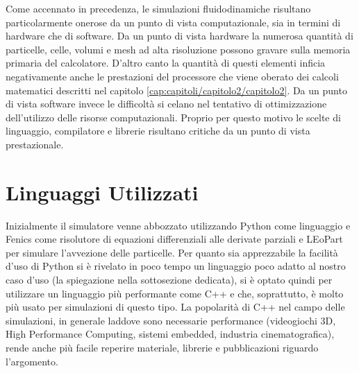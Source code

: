 Come accennato in precedenza, le simulazioni fluidodinamiche risultano
particolarmente onerose da un punto di vista computazionale, sia in termini di
hardware che di software. Da un punto di vista hardware la numerosa quantità di
particelle, celle, volumi e mesh ad alta risoluzione possono gravare sulla memoria primaria del
calcolatore. D'altro canto la quantità di questi elementi inficia negativamente
anche le prestazioni del processore che viene oberato dei calcoli matematici
descritti nel capitolo \ref{cap:capitoli/capitolo2/capitolo2}. \newline
Da un punto di vista software invece le difficoltà si celano nel tentativo di
ottimizzazione dell'utilizzo delle risorse computazionali. Proprio per questo motivo
le scelte di linguaggio, compilatore e librerie risultano critiche da un punto di vista
prestazionale.


\section{Linguaggi Utilizzati}
Inizialmente il simulatore venne abbozzato utilizzando Python come linguaggio e
Fenics \cite{AlnaesBlechta2015a} come risolutore di equazioni differenziali alle derivate
parziali e LEoPart \cite{maljaars2020} per simulare l'avvezione delle particelle.
Per quanto sia apprezzabile la facilità d'uso di Python si è rivelato in poco tempo un
linguaggio poco adatto al nostro caso d'uso (la spiegazione nella sottosezione dedicata),
si è optato quindi per utilizzare un linguaggio più performante come C++ e che, soprattutto,
è molto più usato per simulazioni di questo tipo. La popolarità di C++ nel campo delle simulazioni, in generale laddove sono necessarie performance
(videogiochi 3D, High Performance Computing, sistemi embedded, industria cinematografica),
rende anche più facile reperire materiale, librerie e pubblicazioni riguardo l'argomento.
